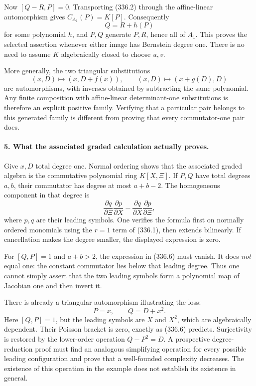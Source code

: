 \documentclass[11pt]{article}
\begin{document}
Now $[Q-R,P]=0$. Transporting (336.2) through the affine-linear automorphism gives $C_{A_1}(P)=K[P]$. Consequently
\[
 Q=R+h(P)
\]
for some polynomial $h$, and $P,Q$ generate $P,R$, hence all of $A_1$. This proves the selected assertion whenever either image has Bernstein degree one. There is no need to assume $K$ algebraically closed to choose $u,v$.

More generally, the two triangular substitutions
\[
 (x,D)\longmapsto(x,D+f(x)),\qquad
 (x,D)\longmapsto(x+g(D),D)
 \tag{336.5}
\]
are automorphisms, with inverses obtained by subtracting the same polynomial. Any finite composition with affine-linear determinant-one substitutions is therefore an explicit positive family. Verifying that a particular pair belongs to this generated family is different from proving that every commutator-one pair does.

\paragraph{5. What the associated graded calculation actually proves.}
Give $x,D$ total degree one. Normal ordering shows that the associated graded algebra is the commutative polynomial ring $K[X,\Xi]$. If $P,Q$ have total degrees $a,b$, their commutator has degree at most $a+b-2$. The homogeneous component in that degree is
\[
 \frac{\partial q}{\partial\Xi}\frac{\partial p}{\partial X}
 -\frac{\partial q}{\partial X}\frac{\partial p}{\partial\Xi},
 \tag{336.6}
\]
where $p,q$ are their leading symbols. One verifies the formula first on normally ordered monomials using the $r=1$ term of (336.1), then extends bilinearly. If cancellation makes the degree smaller, the displayed expression is zero.

For $[Q,P]=1$ and $a+b>2$, the expression in (336.6) must vanish. It does \emph{not} equal one: the constant commutator lies below that leading degree. Thus one cannot simply assert that the two leading symbols form a polynomial map of Jacobian one and then invert it.

There is already a triangular automorphism illustrating the loss:
\[
 P=x,\qquad Q=D+x^2.
\]
Here $[Q,P]=1$, but the leading symbols are $X$ and $X^2$, which are algebraically dependent. Their Poisson bracket is zero, exactly as (336.6) predicts. Surjectivity is restored by the lower-order operation $Q-P^2=D$. A prospective degree-reduction proof must find an analogous simplifying operation for every possible leading configuration and prove that a well-founded complexity decreases. The existence of this operation in the example does not establish its existence in general.
\end{document}
